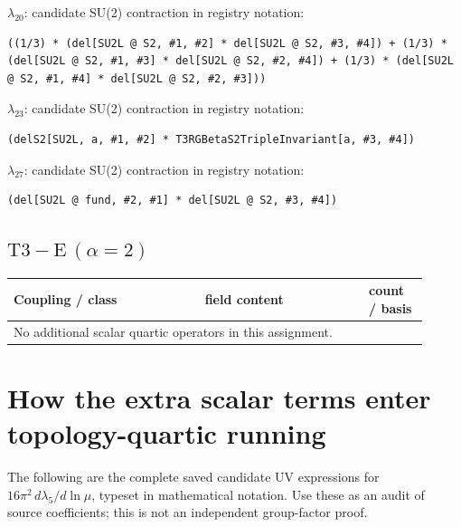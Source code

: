 \documentclass[9pt,a4paper]{article}
\begin{document}
\textbf{$ \lambda_{20} $}: candidate SU(2) contraction in registry notation:
\begin{lstlisting}[mathescape=true]
((1/3) * (del[SU2L @ S2, #1, #2] * del[SU2L @ S2, #3, #4]) + (1/3) * (del[SU2L @ S2, #1, #3] * del[SU2L @ S2, #2, #4]) + (1/3) * (del[SU2L @ S2, #1, #4] * del[SU2L @ S2, #2, #3]))
\end{lstlisting}

\textbf{$ \lambda_{23} $}: candidate SU(2) contraction in registry notation:
\begin{lstlisting}[mathescape=true]
(delS2[SU2L, a, #1, #2] * T3RGBetaS2TripleInvariant[a, #3, #4])
\end{lstlisting}

\textbf{$ \lambda_{27} $}: candidate SU(2) contraction in registry notation:
\begin{lstlisting}[mathescape=true]
(del[SU2L @ fund, #2, #1] * del[SU2L @ S2, #3, #4])
\end{lstlisting}

\subsection*{$ \mathrm{T3-E}\,(\alpha=2) $}
\begin{longtable}{@{}p{0.42\linewidth}p{0.36\linewidth}p{0.13\linewidth}@{}}
\toprule
Coupling / class & field content & count / basis\\
\midrule
\endhead
\multicolumn{3}{l}{No additional scalar quartic operators in this assignment.}\\
\bottomrule
\end{longtable}
\section*{How the extra scalar terms enter topology-quartic running}
The following are the complete saved candidate UV expressions for $16\pi^2\,d\lambda_{5}/d\ln\mu$, typeset in mathematical notation. Use these as an audit of source coefficients; this is not an independent group-factor proof.
\end{document}
